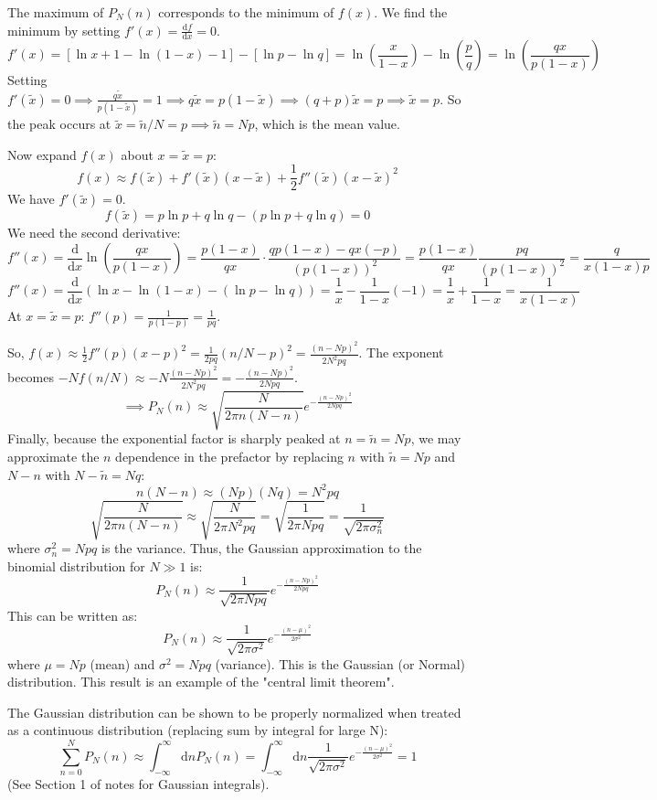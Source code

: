 \documentclass[11pt]{article}
\newcommand{\dd}[1]{\mathrm{d}#1} %
\newcommand{\deriv}[2]{\frac{\mathrm{d} #1}{\mathrm{d} #2}}
\begin{document}
The maximum of $P_N(n)$ corresponds to the minimum of $f(x)$. We find the minimum by setting $f'(x) = \deriv{f}{x} = 0$.
\[ f'(x) = [\ln x + 1 - \ln(1-x) - 1] - [\ln p - \ln q] = \ln\left(\frac{x}{1-x}\right) - \ln\left(\frac{p}{q}\right) = \ln\left(\frac{q x}{p (1-x)}\right) \]
Setting $f'(\tilde{x}) = 0 \implies \frac{q \tilde{x}}{p (1-\tilde{x})} = 1 \implies q \tilde{x} = p (1-\tilde{x}) \implies (q+p)\tilde{x} = p \implies \tilde{x} = p$.
So the peak occurs at $\tilde{x} = \tilde{n}/N = p \implies \tilde{n} = Np$, which is the mean value.

Now expand $f(x)$ about $x = \tilde{x} = p$:
\[ f(x) \approx f(\tilde{x}) + f'(\tilde{x})(x-\tilde{x}) + \frac{1}{2} f''(\tilde{x}) (x-\tilde{x})^2 \]
We have $f'(\tilde{x})=0$.
\[ f(\tilde{x}) = p\ln p + q\ln q - (p\ln p + q\ln q) = 0 \]
We need the second derivative:
\[ f''(x) = \deriv{}{x} \ln\left(\frac{q x}{p (1-x)}\right) = \frac{p(1-x)}{qx} \cdot \frac{q p (1-x) - qx(-p)}{(p(1-x))^2} = \frac{p(1-x)}{qx} \frac{pq}{(p(1-x))^2} = \frac{q}{x(1-x)p} \]
\[ f''(x) = \deriv{}{x} \left( \ln x - \ln(1-x) - (\ln p - \ln q) \right) = \frac{1}{x} - \frac{1}{1-x}(-1) = \frac{1}{x} + \frac{1}{1-x} = \frac{1}{x(1-x)} \]
At $x=\tilde{x}=p$: $f''(p) = \frac{1}{p(1-p)} = \frac{1}{pq}$.

So, $f(x) \approx \frac{1}{2} f''(p) (x-p)^2 = \frac{1}{2pq} (n/N - p)^2 = \frac{(n-Np)^2}{2 N^2 pq}$.
The exponent becomes $-N f(n/N) \approx -N \frac{(n-Np)^2}{2 N^2 pq} = -\frac{(n-Np)^2}{2Npq}$.
\[ \implies P_N(n) \approx \sqrt{\frac{N}{2\pi n (N-n)}} e^{-\frac{(n-Np)^2}{2Npq}} \]
Finally, because the exponential factor is sharply peaked at $n = \tilde{n} = Np$, we may approximate the $n$ dependence in the prefactor by replacing $n$ with $\tilde{n}=Np$ and $N-n$ with $N-\tilde{n}=Nq$:
\[ n(N-n) \approx (Np)(Nq) = N^2 pq \]
\[ \sqrt{\frac{N}{2\pi n (N-n)}} \approx \sqrt{\frac{N}{2\pi N^2 pq}} = \sqrt{\frac{1}{2\pi N pq}} = \frac{1}{\sqrt{2\pi \sigma_n^2}} \]
where $\sigma_n^2 = Npq$ is the variance.
Thus, the Gaussian approximation to the binomial distribution for $N \gg 1$ is:
\[ P_N(n) \approx \frac{1}{\sqrt{2\pi Npq}} e^{-\frac{(n-Np)^2}{2Npq}} \]
This can be written as:
\[ P_N(n) \approx \frac{1}{\sqrt{2\pi \sigma^2}} e^{-\frac{(n-\mu)^2}{2\sigma^2}} \]
where $\mu = Np$ (mean) and $\sigma^2 = Npq$ (variance).
This is the Gaussian (or Normal) distribution. This result is an example of the "central limit theorem".

The Gaussian distribution can be shown to be properly normalized when treated as a continuous distribution (replacing sum by integral for large N):
\[ \sum_{n=0}^N P_N(n) \approx \int_{-\infty}^{\infty} \dd{n} P_N(n) = \int_{-\infty}^{\infty} \dd{n} \frac{1}{\sqrt{2\pi \sigma^2}} e^{-\frac{(n-\mu)^2}{2\sigma^2}} = 1 \]
(See Section 1 of notes for Gaussian integrals).
\end{document}
